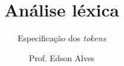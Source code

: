 \title{Análise léxica}
\subtitle{Especificação dos \textit{tokens}}
\date{}
\author{Prof. Edson Alves}
